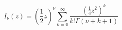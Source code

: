 \documentclass[12pt]{article}
\begin{document}
\begin{displaymath}
I_\nu(z) = \left(\frac{1}{2}z\right)^\nu \sum_{k=0}^\infty
    \frac{(\frac{1}{4}z^2)^k}{k!\Gamma(\nu+k+1)}
\end{displaymath}
\end{document}
